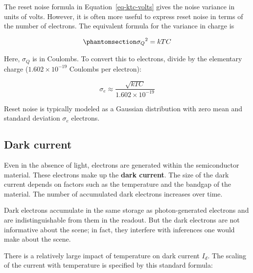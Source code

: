 \documentclass[
  letterpaper,
]{book}
\begin{document}
\begin{tcolorbox}[enhanced jigsaw, colframe=quarto-callout-note-color-frame, titlerule=0mm, rightrule=.15mm, opacitybacktitle=0.6, colback=white, leftrule=.75mm, coltitle=black, title=\textcolor{quarto-callout-note-color}{\faInfo}\hspace{0.5em}{Reset noise units}, bottomrule=.15mm, colbacktitle=quarto-callout-note-color!10!white, breakable, left=2mm, bottomtitle=1mm, toptitle=1mm, opacityback=0, arc=.35mm, toprule=.15mm]

The reset noise formula in Equation~\ref{eq-ktc-volts} gives the noise
variance in units of volts. However, it is often more useful to express
reset noise in terms of the number of electrons. The equivalent formula
for the variance in charge is

\begin{equation}\phantomsection\label{eq-ktc-electrons}{
{\sigma_Q}^2 = k T C
}\end{equation}

Here, \({\sigma_Q}\) is in Coulombs. To convert this to electrons,
divide by the elementary charge (\(1.602 \times 10^{-19}\) Coulombs per
electron):

\[
\sigma_e \approx \frac{\sqrt{k T C}}{1.602 \times 10^{-19}}
\]

Reset noise is typically modeled as a Gaussian distribution with zero
mean and standard deviation \(\sigma_e\) electrons.

\end{tcolorbox}

\subsection{Dark current}\label{sec-dark-current}

Even in the absence of light, electrons are generated within the
semiconductor material. These electrons make up the \textbf{dark
current}. The size of the dark current depends on factors such as the
temperature and the bandgap of the material. The number of accumulated
dark electrons increases over time.

Dark electrons accumulate in the same storage as photon-generated
electrons and are indistinguishable from them in the readout. But the
dark electrons are not informative about the scene; in fact, they
interfere with inferences one would make about the scene.

There is a relatively large impact of temperature on dark current
\(I_d\). The scaling of the current with temperature is specified by
this standard formula:
\end{document}
